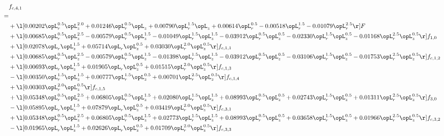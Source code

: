 \begin{alignat}{2} 
\label{eq:f_41_1} 
& f_{c,4,1} \nonumber \\ 
 = \\ 
& + \l[  0.00202 \opL_r^{0.5} \opL_z^{2.0} +  0.01246 \opL_r^{0.5} \opL_z +  0.00790 \opL_r^{1.5} \opL_z +  0.00614 \opL_r^{0.5}   -0.00518 \opL_r^{1.5}   -0.01079 \opL_r^{2.5}  \r] F \nonumber \\ 
& + \l[  0.00685 \opL_r^{0.5} \opL_z^{2.5}   -0.00579 \opL_r^{0.5} \opL_z^{1.5}   -0.01049 \opL_r^{1.5} \opL_z^{1.5}   -0.03912 \opL_r^{0.5} \opL_z^{0.5}   -0.02330 \opL_r^{1.5} \opL_z^{0.5}   -0.01168 \opL_r^{2.5} \opL_z^{0.5}  \r] f_{1,0} \nonumber \\ 
& + \l[  0.02078 \opL_r \opL_z^{1.5} +  0.05714 \opL_r \opL_z^{0.5} +  0.03030 \opL_r^{2.0} \opL_z^{0.5}  \r] f_{c,1,1} \nonumber \\ 
& + \l[  0.00685 \opL_r^{0.5} \opL_z^{2.5}   -0.00579 \opL_r^{0.5} \opL_z^{1.5}   -0.01398 \opL_r^{1.5} \opL_z^{1.5}   -0.03912 \opL_r^{0.5} \opL_z^{0.5}   -0.03106 \opL_r^{1.5} \opL_z^{0.5}   -0.01753 \opL_r^{2.5} \opL_z^{0.5}  \r] f_{c,1,2} \nonumber \\ 
& + \l[  0.00693 \opL_r \opL_z^{1.5} +  0.01905 \opL_r \opL_z^{0.5} +  0.01515 \opL_r^{2.0} \opL_z^{0.5}  \r] f_{c,1,3} \nonumber \\ 
& - \l[  0.00350 \opL_r^{1.5} \opL_z^{1.5} +  0.00777 \opL_r^{1.5} \opL_z^{0.5} +  0.00701 \opL_r^{2.5} \opL_z^{0.5}  \r] f_{c,1,4} \nonumber \\ 
& + \l[  0.00303 \opL_r^{2.0} \opL_z^{0.5}  \r] f_{c,1,5} \nonumber \\ 
& + \l[  0.05348 \opL_r^{0.5} \opL_z^{2.5} +  0.06805 \opL_r^{0.5} \opL_z^{1.5} +  0.02080 \opL_r^{1.5} \opL_z^{1.5} +  0.08993 \opL_r^{0.5} \opL_z^{0.5} +  0.02743 \opL_r^{1.5} \opL_z^{0.5} +  0.01311 \opL_r^{2.5} \opL_z^{0.5}  \r] f_{3,0} \nonumber \\ 
& - \l[  0.05895 \opL_r \opL_z^{1.5} +  0.07879 \opL_r \opL_z^{0.5} +  0.03419 \opL_r^{2.0} \opL_z^{0.5}  \r] f_{c,3,1} \nonumber \\ 
& + \l[  0.05348 \opL_r^{0.5} \opL_z^{2.5} +  0.06805 \opL_r^{0.5} \opL_z^{1.5} +  0.02773 \opL_r^{1.5} \opL_z^{1.5} +  0.08993 \opL_r^{0.5} \opL_z^{0.5} +  0.03658 \opL_r^{1.5} \opL_z^{0.5} +  0.01966 \opL_r^{2.5} \opL_z^{0.5}  \r] f_{c,3,2} \nonumber \\ 
& - \l[  0.01965 \opL_r \opL_z^{1.5} +  0.02626 \opL_r \opL_z^{0.5} +  0.01709 \opL_r^{2.0} \opL_z^{0.5}  \r] f_{c,3,3} \nonumber \\ 

\end{alignat}
